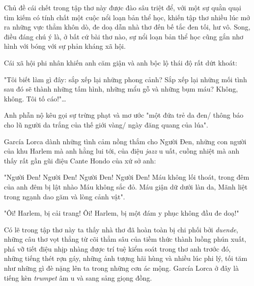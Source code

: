 \documentclass[../main.tex]{subfiles}
\begin{document}
\begin{multicols}{2}
\begin{blockquote}
\end{blockquote}
 
Chủ đề cái chết trong tập thơ này được đào sâu triệt để, với một sự quằn quại tìm kiếm có tính chất một cuộc nổi loạn bản thể học, khiến tập thơ nhiều lúc mở ra những vực thẳm khôn dò, đe doạ dẫn nhà thơ đến bế tắc đen tối, hư vô. Song, điều đáng chú ý là, ở bất cứ bài thơ nào, sự nổi loạn bản thể học cũng gắn nhơ hình với bóng với sự phản kháng xã hội. 
 
Cái xã hội phi nhân khiến anh căm giận và anh bộc lộ thái độ rất dứt khoát: 
\begin{blockquote}
        
"Tôi biết làm gì đây: sắp xếp lại những phong cảnh? 
Sắp xếp lại những mối tình sau đó sẽ thành những tấm hình, những mẩu gỗ và những bụm máu?        
Không, không. Tôi tố cáo!"… 

\end{blockquote}
 
Anh phẫn nộ kêu gọi sự trừng phạt và mơ ước "một đứa trẻ da đen/ thông báo cho lũ người da trắng của thế giới vàng/ ngày đăng quang của lúa". 
 
García Lorca dành những tình cảm nồng thắm cho Người Đen, những con người của khu Harlem mà anh hằng lui tới, của điệu \textit{jazz} u uất, cuồng nhiệt mà anh thấy rất gần gũi điệu Cante Hondo của xứ sở anh: 
\begin{blockquote}
        
"Người Đen! Người Đen! Người Đen! Người Đen!        
Máu không lối thoát, trong đêm của anh đêm bị lật nhào        
Máu không sắc đỏ. Máu giận dữ dưới làn da,        
Mãnh liệt trong ngạnh dao găm và lòng cảnh vật". 
        
"Ôi! Harlem, bị cải trang!        
Ôi! Harlem, bị một đám y phục không đầu đe doạ!" 

\end{blockquote}
 
Có lẽ trong tập thơ này ta thấy nhà thơ đã hoàn toàn bị chi phối bởi \textit{duende}, những câu thơ vọt thẳng từ cõi thẳm sâu của tiềm thức thành luồng phún xuất, phá vỡ tiết điệu nhịp nhàng được trí tuệ kiểm soát trong thơ anh trơớc đó, những tiếng thét rợn gáy, những ảnh tượng hãi hùng và nhiều lúc phi lý, tối tăm như những gì đè nặng lên ta trong những cơn ác mộng. García Lorca ở đây là tiếng kèn \textit{trumpet} âm u và sang sảng giọng đồng. 
 

\end{multicols}
\end{document}
